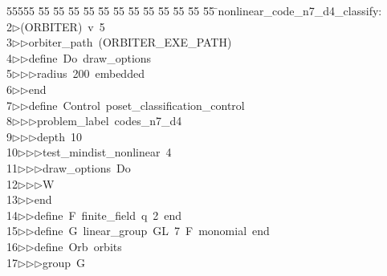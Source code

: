 %
%
\begin{tabbing}
55555 \= 55 \= 55 \= 55 \= 55 \= 55 \= 55 \= 55 \= 55 \= 55 \= 55 \= 55 \= 55 \= \>nonlinear\_code\_n7\_d4\_classify:\\[0pt]
2\>$\triangleright$\>(ORBITER)\ v\ 5\ \\[0pt]
3\>$\triangleright$\>$\triangleright$\>orbiter\_path\ (ORBITER\_EXE\_PATH)\ \\[0pt]
4\>$\triangleright$\>$\triangleright$\>define\ Do\ draw\_options\ \\[0pt]
5\>$\triangleright$\>$\triangleright$\>$\triangleright$\>radius\ 200\ embedded\ \\[0pt]
6\>$\triangleright$\>$\triangleright$\>end\ \\[0pt]
7\>$\triangleright$\>$\triangleright$\>define\ Control\ poset\_classification\_control\ \\[0pt]
8\>$\triangleright$\>$\triangleright$\>$\triangleright$\>problem\_label\ codes\_n7\_d4\ \\[0pt]
9\>$\triangleright$\>$\triangleright$\>$\triangleright$\>depth\ 10\ \\[0pt]
10\>$\triangleright$\>$\triangleright$\>$\triangleright$\>test\_mindist\_nonlinear\ 4\ \\[0pt]
11\>$\triangleright$\>$\triangleright$\>$\triangleright$\>draw\_options\ Do\ \\[0pt]
12\>$\triangleright$\>$\triangleright$\>$\triangleright$\>W\ \\[0pt]
13\>$\triangleright$\>$\triangleright$\>end\ \\[0pt]
14\>$\triangleright$\>$\triangleright$\>define\ F\ finite\_field\ q\ 2\ end\ \\[0pt]
15\>$\triangleright$\>$\triangleright$\>define\ G\ linear\_group\ GL\ 7\ F\ monomial\ end\ \\[0pt]
16\>$\triangleright$\>$\triangleright$\>define\ Orb\ orbits\ \\[0pt]
17\>$\triangleright$\>$\triangleright$\>$\triangleright$\>group\ G\ \\[0pt]

\end{tabbing}
